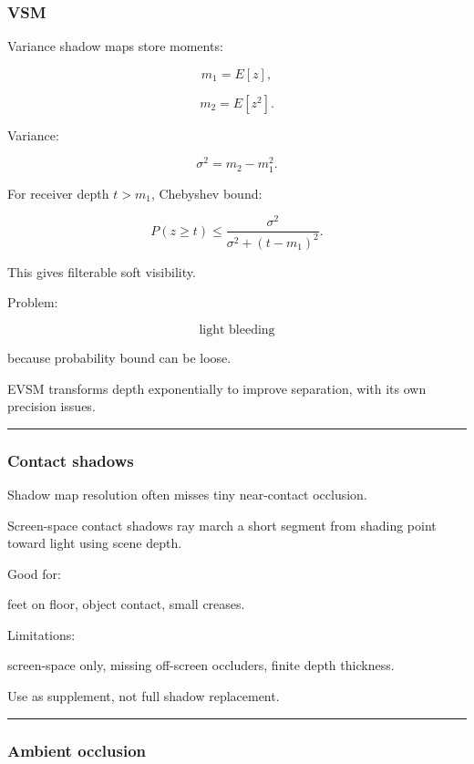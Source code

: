 \subsubsection{VSM}\label{vsm}

Variance shadow maps store moments:

\[
m_1=E[z],
\]

\[
m_2=E[z^2].
\]

Variance:

\[
\sigma^2=
m_2-m_1^2.
\]

For receiver depth \(t>m_1\), Chebyshev bound:

\[
\boxed{
P(z\ge t)
\le
\frac{
\sigma^2
}{
\sigma^2+(t-m_1)^2
}.
}
\]

This gives filterable soft visibility.

Problem:

\[
\boxed{\text{light bleeding}}
\]

because probability bound can be loose.

EVSM transforms depth exponentially to improve separation, with its own precision issues.

\begin{center}\rule{0.5\linewidth}{0.5pt}\end{center}

\subsubsection{Contact shadows}\label{contact-shadows}

Shadow map resolution often misses tiny near-contact occlusion.

Screen-space contact shadows ray march a short segment from shading point toward light using scene depth.

Good for:

feet on floor, object contact, small creases.

Limitations:

screen-space only, missing off-screen occluders, finite depth thickness.

Use as supplement, not full shadow replacement.

\begin{center}\rule{0.5\linewidth}{0.5pt}\end{center}

\subsubsection{Ambient occlusion}\label{ambient-occlusion}

